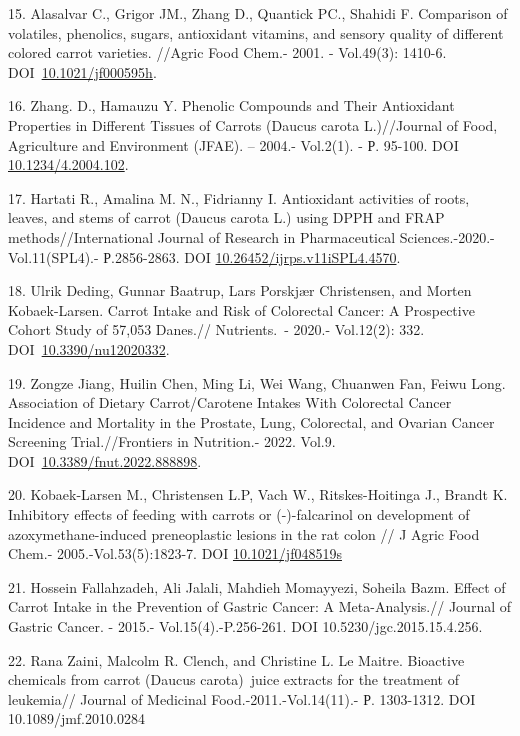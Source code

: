 15. Alasalvar C., Grigor JM., Zhang D., Quantick PC., Shahidi F.
Comparison of volatiles, phenolics, sugars, antioxidant vitamins, and
sensory quality of different colored carrot varieties. //Agric Food
Chem.- 2001. - Vol.49(3): 1410-6.
DOI~\href{https://doi.org/10.1021/jf000595h}{10.1021/jf000595h}.

16. Zhang. D., Hamauzu Y. Phenolic Compounds and Their Antioxidant
Properties in Different Tissues of Carrots (Daucus carota L.)//Journal
of Food, Agriculture and Environment (JFAE). -- 2004.- Vol.2(1). - Р.
95-100. DOI~ \href{javascript:void()}{10.1234/4.2004.102}.

17. Hartati R., Amalina M. N., Fidrianny I. Antioxidant activities of
roots, leaves, and stems of carrot (Daucus carota L.) using DPPH and
FRAP methods//International Journal of Research in Pharmaceutical
Sciences.-2020.-Vol.11(SPL4).- Р.2856-2863. DOI
\href{http://dx.doi.org/10.26452/ijrps.v11iSPL4.4570}{10.26452/ijrps.v11iSPL4.4570}.

18. Ulrik Deding, Gunnar Baatrup, Lars Porskjær Christensen, and Morten
Kobaek-Larsen. Carrot Intake and Risk of Colorectal Cancer: A
Prospective Cohort Study of 57,053 Danes.// Nutrients.~- 2020.-
Vol.12(2): 332.
DOI~\href{https://doi.org/10.3390/nu12020332}{10.3390/nu12020332}.

19. Zongze Jiang, Huilin Chen, Ming Li, Wei Wang, Chuanwen Fan, Feiwu
Long. Association of Dietary Carrot/Carotene Intakes With Colorectal
Cancer Incidence and Mortality in the Prostate, Lung, Colorectal, and
Ovarian Cancer Screening Trial.//Frontiers in Nutrition.- 2022. Vol.9.
DOI~\href{https://doi.org/10.3389/fnut.2022.888898}{10.3389/fnut.2022.888898}.

20. Kobaek-Larsen M., Christensen L.P, Vach W., Ritskes-Hoitinga J.,
Brandt K. Inhibitory effects of feeding with carrots or (-)-falcarinol
on development of azoxymethane-induced preneoplastic lesions in the rat
colon // J Agric Food Chem.- 2005.-Vol.53(5):1823-7. DOI
\href{https://doi.org/10.1021/jf048519s}{10.1021/jf048519s}

21. Hossein Fallahzadeh, Ali Jalali, Mahdieh Momayyezi, Soheila Bazm.
Effect of Carrot Intake in the Prevention of Gastric Cancer: A
Meta-Analysis.// Journal of Gastric Cancer. - 2015.-
Vol.15(4).-P.256-261. DOI 10.5230/jgc.2015.15.4.256.

22. Rana Zaini, Malcolm R. Clench, and Christine L. Le Maitre. Bioactive
chemicals from carrot (Daucus carota)~juice extracts for the treatment
of leukemia// Journal of Medicinal Food.-2011.-Vol.14(11).- Р.
1303-1312. DOI 10.1089/jmf.2010.0284

